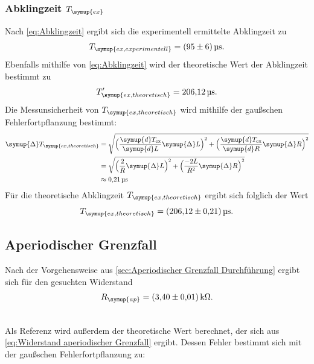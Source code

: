 \subsubsection{Abklingzeit $T_{\symup{ex}}$}
Nach \eqref{eq:Abklingzeit} ergibt sich die experimentell ermittelte Abklingzeit zu
\begin{equation*}
  T_{\symup{ex, experimentell}} = \qty{95+-6}{\micro\second}.
\end{equation*}
Ebenfalls mithilfe von \eqref{eq:Abklingzeit} wird der theoretische Wert der Abklingzeit bestimmt zu
\begin{equation*}
  T'_{\symup{ex, theoretisch}} = \qty{206.12}{\micro\second}.
\end{equation*}
Die Messunsicherheit von $T_{\symup{ex, theoretisch}}$ wird mithilfe der gaußschen Fehlerfortpflanzung bestimmt:
\begin{align*}
  \symup{\Delta}T_{\symup{ex, theoretisch}} &= \sqrt{\Bigl(\frac{\symup{d}T_{\text{ex}}}{\symup{d}L}\symup{\Delta} L \Bigr)^2+
  \Bigl(\frac{\symup{d}T_{\text{ex}}}{\symup{d}R}\symup{\Delta} R\Bigr)^2} \\
  &=\sqrt{\Bigl(\frac{2}{R}\symup{\Delta} L\Bigr)^2+\Bigl(\frac{-2L}{R^2}\symup{\Delta}R\Bigr)^2} \\
  &\approx \qty{0.21}{\micro\second}
\end{align*}
Für die theoretische Abklingzeit $T_{\symup{ex, theoretisch}}$ ergibt sich folglich der Wert
\begin{equation*}
  T_{\symup{ex, theoretisch}} = \qty{206.12+-0.21}{\micro\second}.
\end{equation*}

\subsection{Aperiodischer Grenzfall}
\label{sec:Aperiodischer Grenzfall}

Nach der Vorgehensweise aus \ref{sec:Aperiodischer Grenzfall Durchführung} ergibt sich für den gesuchten Widerstand \\
\begin{gather*}
  R_{\symup{ap}} = \qty{3,40+-0.01}{\kilo\ohm}. \\ \notag
\end{gather*}

Als Referenz wird außerdem der theoretische Wert berechnet, der sich aus \eqref{eq:Widerstand aperiodischer Grenzfall} ergibt.
Dessen Fehler bestimmt sich mit der gaußschen Fehlerfortpflanzung zu:

